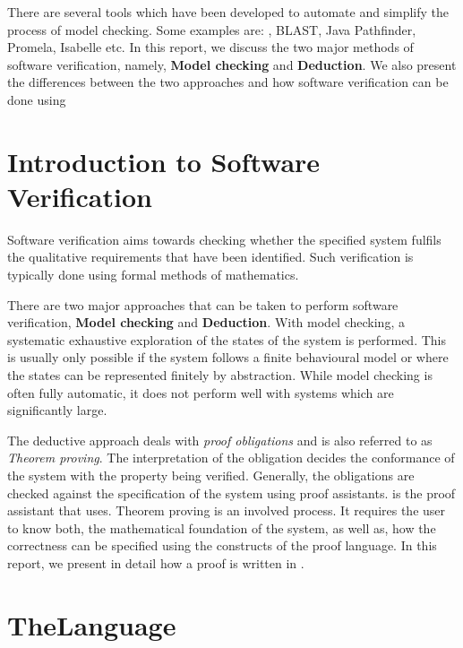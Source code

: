 \documentclass[fleqn]{tukseminar}
\begin{document}
			There are several tools which have been developed to automate and simplify the process of model checking. Some examples are: \tla, BLAST\cite{blast}, Java Pathfinder\cite{pathfinder}, Promela\cite{promela}, Isabelle\cite{isabelle} etc. In this report, we discuss the two major methods of software verification, namely, \textbf{Model checking} and \textbf{Deduction}. We also present the differences between the two approaches and how software verification can be done using \tla
			
			\newpage
			
			
			\tableofcontents
			
			\newpage
			
			\section{Introduction to Software Verification}
			Software verification aims towards checking whether the specified system fulfils the qualitative requirements that have been identified. Such verification is typically done using formal methods of mathematics. 
			
			There are two major approaches that can be taken to perform software verification, \textbf{Model checking} and \textbf{Deduction}. With model checking, a systematic exhaustive exploration of the states of the system is performed. This is usually only possible if the system follows a finite behavioural model or where the states can be represented finitely by abstraction. While model checking is often fully automatic, it does not perform well with systems which are significantly large. 
			
			The deductive approach deals with \textit{proof obligations} and is also referred to as \textit{Theorem proving}. The interpretation of the obligation decides the conformance of the system with the property being verified. Generally, the obligations are checked against the specification of the system using proof assistants. \tlaps is the proof assistant that \tla uses. Theorem proving is an involved process. It requires the user to know both, the mathematical foundation of the system, as well as, how the correctness can be specified using the constructs of the proof language. In this report, we present in detail how a proof is written in \tla.
			
			\section{The\tla Language}
			\label{sec:tlalanguage}
			
\end{document}
